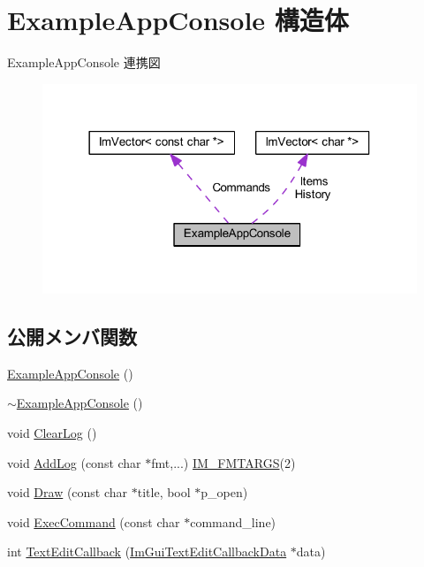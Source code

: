 \hypertarget{struct_example_app_console}{}\section{Example\+App\+Console 構造体}
\label{struct_example_app_console}


Example\+App\+Console 連携図\nopagebreak
\begin{figure}[H]
\begin{center}
\leavevmode
\includegraphics[width=318pt]{struct_example_app_console__coll__graph}
\end{center}
\end{figure}
\subsection*{公開メンバ関数}
\begin{DoxyCompactItemize}
\item 
\mbox{\hyperlink{struct_example_app_console_a405521e6aa8f97954b67315baf8d6147}{Example\+App\+Console}} ()
\item 
\mbox{\hyperlink{struct_example_app_console_a91ef200056f867cf97a57db91bb991c4}{$\sim$\+Example\+App\+Console}} ()
\item 
void \mbox{\hyperlink{struct_example_app_console_a2ef13f00c474b16b8da2ec062d5e5cc2}{Clear\+Log}} ()
\item 
void \mbox{\hyperlink{struct_example_app_console_a719354ce6be7481923a5fd702e785952}{Add\+Log}} (const char $\ast$fmt,...) \mbox{\hyperlink{imgui_8h_a1251c2f9ddac0873dbad8181bd82c9f1}{I\+M\+\_\+\+F\+M\+T\+A\+R\+GS}}(2)
\item 
void \mbox{\hyperlink{struct_example_app_console_a0518a09c7e8648dd52c7c06df19ac17a}{Draw}} (const char $\ast$title, bool $\ast$p\+\_\+open)
\item 
void \mbox{\hyperlink{struct_example_app_console_aa1e8bf1f3795cbc41597e1ff081c6589}{Exec\+Command}} (const char $\ast$command\+\_\+line)
\item 
int \mbox{\hyperlink{struct_example_app_console_aae97c81ddab660e6e0296c21844c4a7b}{Text\+Edit\+Callback}} (\mbox{\hyperlink{struct_im_gui_text_edit_callback_data}{Im\+Gui\+Text\+Edit\+Callback\+Data}} $\ast$data)
\end{DoxyCompactItemize}
